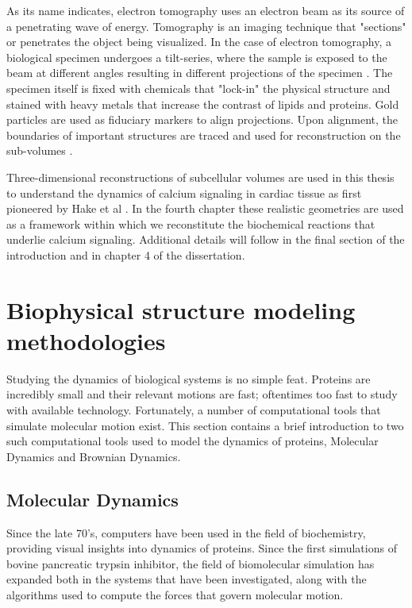 \documentclass[12pt]{ucsddissertation}
\begin{document}
\begin{dissertationintroduction}
As its name indicates, electron tomography uses an electron beam as its source of a penetrating wave of energy. Tomography is an imaging technique that "sections" or penetrates the object being visualized. In the case of electron tomography, a biological specimen undergoes a tilt-series, where the sample is exposed to the beam at different angles resulting in different projections of the specimen \cite{Fridman2012,Koning2018}. The specimen itself is fixed with chemicals that "lock-in" the physical structure and stained with heavy metals that increase the contrast of lipids and proteins. Gold particles are used as fiduciary markers to align projections. Upon alignment, the boundaries of important structures are traced and used for reconstruction on the sub-volumes \cite{Yu2008,Lee2018}.

Three-dimensional reconstructions of subcellular volumes are used in this thesis to understand the dynamics of calcium signaling in cardiac tissue\cite{Hayashi2009} as first pioneered by Hake et al \cite{Hake2012}. In the fourth chapter these realistic geometries are used as a framework within which we reconstitute the biochemical reactions that underlie calcium signaling. Additional details will follow in the final section of the introduction and in chapter 4 of the dissertation. 

\section{Biophysical structure modeling methodologies}
Studying the dynamics of biological systems is no simple feat. Proteins are incredibly small and their relevant motions are fast; oftentimes too fast to study with available technology. Fortunately, a number of computational tools that simulate molecular motion exist. This section contains a brief introduction to two such computational tools used to model the dynamics of proteins, Molecular Dynamics and Brownian Dynamics. 

\subsection{Molecular Dynamics}
Since the late 70's, computers have been used in the field of biochemistry, providing visual insights into dynamics of proteins\cite{Levitt1975,McCammon1979}. Since the first simulations of bovine pancreatic trypsin inhibitor, the field of biomolecular simulation has expanded both in the systems that have been investigated, along with the algorithms used to compute the forces that govern molecular motion.


\end{dissertationintroduction}
\end{document}
